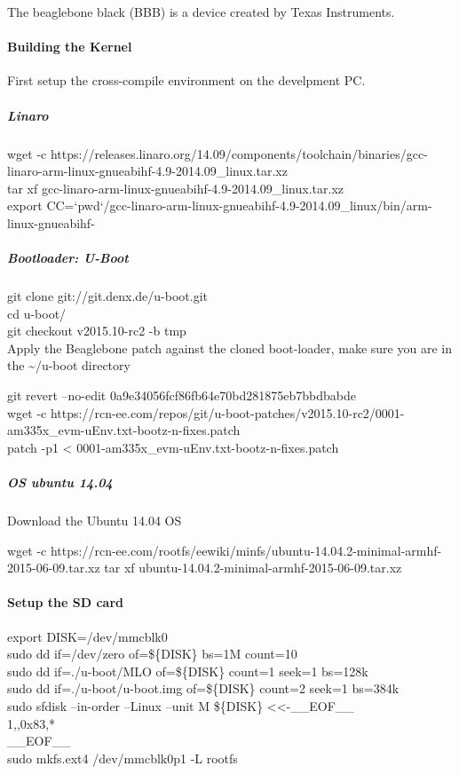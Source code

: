 The beaglebone black (BBB) is a device created by Texas Instruments.

\paragraph{Building the Kernel}
First setup the cross-compile environment on the develpment PC.

\subparagraph{Linaro}
\begin{sBox}
	wget -c https://releases.linaro.org/14.09/components/toolchain/binaries/gcc-linaro-arm-linux-gnueabihf-4.9-2014.09\_linux.tar.xz\\
	tar xf gcc-linaro-arm-linux-gnueabihf-4.9-2014.09\_linux.tar.xz\\
	export CC=`pwd`/gcc-linaro-arm-linux-gnueabihf-4.9-2014.09\_linux/bin/arm-linux-gnueabihf-\\
\end{sBox}

\subparagraph{Bootloader: U-Boot}
\begin{sBox}
	git clone git://git.denx.de/u-boot.git\\
	cd u-boot/\\
	git checkout v2015.10-rc2 -b tmp\\

	Apply the Beaglebone patch against the cloned boot-loader, make sure you are in the \~{}/u-boot directory  
	
	git revert --no-edit 0a9e34056fcf86fb64e70bd281875eb7bbdbabde\\
	wget -c https://rcn-ee.com/repos/git/u-boot-patches/v2015.10-rc2/0001-am335x\_evm-uEnv.txt-bootz-n-fixes.patch\\
	patch -p1 < 0001-am335x\_evm-uEnv.txt-bootz-n-fixes.patch\\
\end{sBox}

\subparagraph{OS ubuntu 14.04}
Download the Ubuntu 14.04 OS  
\begin{sBox}
	wget -c https://rcn-ee.com/rootfs/eewiki/minfs/ubuntu-14.04.2-minimal-armhf-2015-06-09.tar.xz  
	tar xf ubuntu-14.04.2-minimal-armhf-2015-06-09.tar.xz\\
\end{sBox}

\paragraph{Setup the SD card}
\begin{sBox}
	export DISK=/dev/mmcblk0\\
	sudo dd if=/dev/zero of=\$\{DISK\} bs=1M count=10\\
	sudo dd if=./u-boot/MLO of=\$\{DISK\} count=1 seek=1 bs=128k\\
	sudo dd if=./u-boot/u-boot.img of=\$\{DISK\} count=2 seek=1 bs=384k\\
	sudo sfdisk --in-order --Linux --unit M \$\{DISK\} <<-\_\_EOF\_\_\\
	1,,0x83,*\\
	\_\_EOF\_\_\\
	sudo mkfs.ext4 /dev/mmcblk0p1 -L rootfs\\
\end{sBox}

